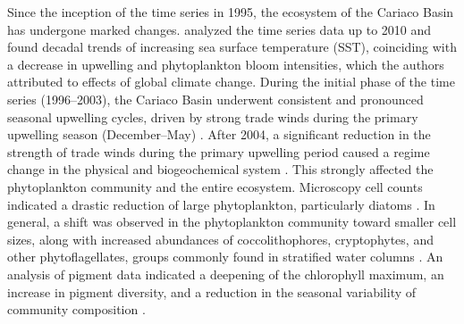 \documentclass[]{agujournal2019}
\begin{document}
Since the inception of the time series in 1995, the ecosystem of the Cariaco Basin has undergone marked changes.  analyzed the time series data up to 2010 and found decadal trends of increasing sea surface temperature (SST), coinciding with a decrease in upwelling and phytoplankton bloom intensities, which the authors attributed to effects of global climate change. During the initial phase of the time series (1996–2003), the Cariaco Basin underwent consistent and pronounced seasonal upwelling cycles, driven by strong trade winds during the primary upwelling season (December–May) \cite{mullerkarger_annual_2001, astor_seasonal_2003}. After 2004, a significant reduction in the strength of trade winds during the primary upwelling period caused a regime change in the physical and biogeochemical system \cite{taylor_ecosystem_2012}. This strongly affected the phytoplankton community and the entire ecosystem. Microscopy cell counts indicated a drastic reduction of large phytoplankton, particularly diatoms \cite{pinckney_phytoplankton_2015}. In general, a shift was observed in the phytoplankton community toward smaller cell sizes, along with increased abundances of coccolithophores, cryptophytes, and other phytoflagellates, groups commonly found in stratified water columns \cite{lorenzoni_characterization_2015}. An analysis of pigment data indicated a deepening of the chlorophyll maximum, an increase in pigment diversity, and a reduction in the seasonal variability of community composition \cite{pinckney_phytoplankton_2015}. 
\end{document}
